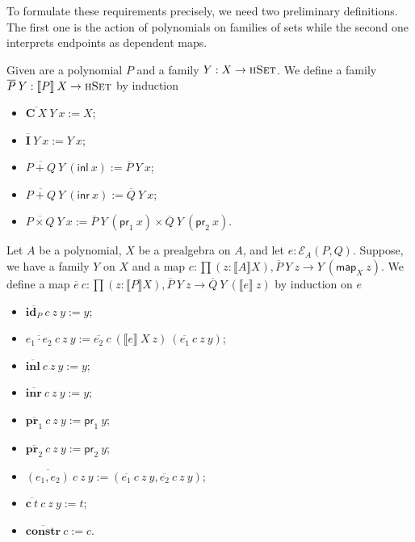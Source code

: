 \documentclass[9pt]{entcs}
\newcommand{\type}[1]{\textsc{#1}}
\newcommand{\term}[1]{\mathsf{#1}}
\newcommand{\constructor}[1]{\mathbf{#1}}
\newcommand{\nattranstxt}[1]{\mathsf{#1}}
\newcommand{\function}[1]{\mathsf{#1}}
\newcommand{\deprod}[3]{\prod(#1 : #2), #3} %
\newcommand{\hset}{\type{hSet}} %
\newcommand{\0}{\textbf{0}} %
\newcommand{\1}{\textbf{1}} %
\newcommand{\inl}{\term{inl}} %
\newcommand{\inr}{\term{inr}} %
\newcommand{\prl}{\term{pr}_1} %
\newcommand{\prr}{\term{pr}_2} %
\newcommand{\Def}{:=} %
\newcommand{\prlt}{\nattranstxt{pr}_1} %
\newcommand{\prrt}{\nattranstxt{pr}_2} %
\newcommand{\C}{\constructor{C}} %
\newcommand{\I}{\constructor{I}} %
\newcommand{\sumP}[2]{#1 + #2} %
\newcommand{\prodP}[2]{#1 \times #2} %
\newcommand{\ep}[3]{\mathcal{E}_{#1}(#2,#3)} %
\newcommand{\id}[1]{\constructor{id}_{#1}} %
\newcommand{\comp}[2]{#1 \cdot #2} %
\newcommand{\inle}{\constructor{inl}} %
\newcommand{\inre}{\constructor{inr}} %
\newcommand{\prle}{\constructor{pr}_1} %
\newcommand{\prre}{\constructor{pr}_2} %
\newcommand{\pair}[2]{(#1 , #2)} %
\newcommand{\Ce}{\constructor{c}} %
\newcommand{\constr}{\constructor{constr}} %
\newcommand{\semP}[1]{\llbracket #1 \rrbracket} %
\newcommand{\semE}[1]{\llbracket #1 \rrbracket} %
\newcommand{\constrA}[1]{\function{map}_{#1}} %
\newcommand{\polydact}[2]{\overline{#1} \> #2} %
\newcommand{\epdact}[2]{\overline{#1} \> #2} %
\begin{document}
To formulate these requirements precisely, we need two preliminary definitions.
The first one is the action of polynomials on families of sets while the second one interprets endpoints as dependent maps.

\begin{definition}
Given are a polynomial $P$ and a family $Y : X \rightarrow \hset$.
We define a family $\polydact{P}{Y} : \semP{P} \> X \rightarrow \hset$ by induction
\begin{itemize}
	\item $\polydact{\C \> X}{Y} \> x \Def X$;
	\item $\polydact{\I}{Y} \> x \Def Y \> x$;
	\item $\polydact{\sumP{P}{Q}}{Y} \> (\inl \> x) \Def \polydact{P}{Y} \> x$;
	\item $\polydact{\sumP{P}{Q}}{Y} \> (\inr \> x) \Def \polydact{Q}{Y} \> x$;
	\item $\polydact{\prodP{P}{Q}}{Y} \> x \Def \polydact{P}{Y} \> (\prl \> x) \times \polydact{Q}{Y} \> (\prr \> x)$.
\end{itemize}
\end{definition}

\begin{definition}
Let $A$ be a polynomial, $X$ be a prealgebra on $A$, and let $e : \ep{A}{P}{Q}$.
Suppose, we have a family $Y$ on $X$ and a map $c : \deprod{z}{\semP{A}{X}}{\polydact{P}{Y} \> z \rightarrow Y \> (\constrA{X} \> z)}$.
We define a map $\epdact{e}{c} : \deprod{z}{\semP{P}{X}}{\polydact{P}{Y} \> z \rightarrow \polydact{Q}{Y} \> (\semE{e} \> z)}$ by induction on $e$
\begin{itemize}
	\item $\epdact{\id{P}}{c} \> z \> y \Def y$;
	\item $\epdact{\comp{e_1}{e_2}}{c} \> z \> y \Def \epdact{e_2}{c} \> (\semE{e} \> X \> z) \> (\epdact{e_1}{c} \> z \> y)$;
	\item $\epdact{\inle}{c} \> z \> y \Def y$;
	\item $\epdact{\inre}{c} \> z \> y \Def y$;
	\item $\epdact{\prle}{c} \> z \> y \Def \prlt \> y$;
	\item $\epdact{\prre}{c} \> z \> y \Def \prrt \> y$;
	\item $\epdact{\pair{e_1}{e_2}}{c} \> z \> y \Def (\epdact{e_1}{c} \> z \> y , \epdact{e_2}{c} \> z \> y)$;
	\item $\epdact{\Ce \> t}{c} \> z \> y \Def t$;
	\item $\epdact{\constr}{c} \Def c$.
\end{itemize}
\end{definition}
\end{document}
